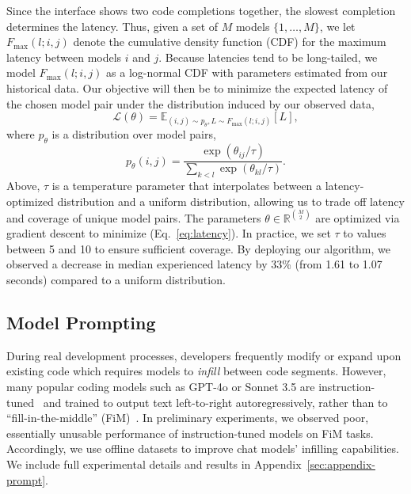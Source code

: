 Since the \systemName interface shows two code completions together, the slowest completion determines the latency.
Thus, given a set of $M$ models $\{1, \ldots, M\}$, we let $F_{\text{max}}(l; i, j)$ denote the cumulative density function (CDF) for the maximum latency between models $i$ and $j$.
Because latencies tend to be long-tailed, we model $F_{\text{max}}(l; i, j)$ as a log-normal CDF with parameters estimated from our historical data.
Our objective will then be to minimize the expected latency of the chosen model pair under the distribution induced by our observed data,
\begin{equation}
    \mathcal{L}(\theta) = \mathbb{E}_{(i, j) \sim p_\theta, L \sim F_{\text{max}}(l;i,j)} [L],
    \label{eq:latency}
\end{equation}
where $p_\theta$ is a distribution over model pairs,
\begin{equation}
p_\theta(i, j) = \frac{\exp(\theta_{ij}/\tau)}{\sum_{k < l} \exp(\theta_{kl}/\tau)}.
\end{equation}
Above, $\tau$ is a temperature parameter that interpolates between a latency-optimized distribution and a uniform distribution, allowing us to trade off latency and coverage of unique model pairs.
The parameters $\theta \in \mathbb{R}^{\binom{M}{2}}$ are optimized via gradient descent to minimize (Eq.~\ref{eq:latency}).
In practice, we set $\tau$ to values between 5 and 10 to ensure sufficient coverage.
By deploying our algorithm, we observed a decrease in median experienced latency by 33\% (from 1.61 to 1.07 seconds) compared to a uniform distribution.





\subsection{Model Prompting}\label{sec:prompting}

During real development processes, developers frequently modify or expand upon existing code which requires models to \emph{infill} between code segments.
However, many popular coding models such as GPT-4o or Sonnet 3.5 are instruction-tuned~\citep{wei2022finetuned} and trained to output text left-to-right autoregressively, rather than to ``fill-in-the-middle'' (FiM)~\citep{fried2023incodergenerativemodelcode, gong2024evaluation}.
In preliminary experiments, we observed poor, essentially unusable performance of instruction-tuned models on FiM tasks.
Accordingly, we use offline datasets to improve chat models' infilling capabilities.
We include full experimental details and results in Appendix~\ref{sec:appendix-prompt}.


